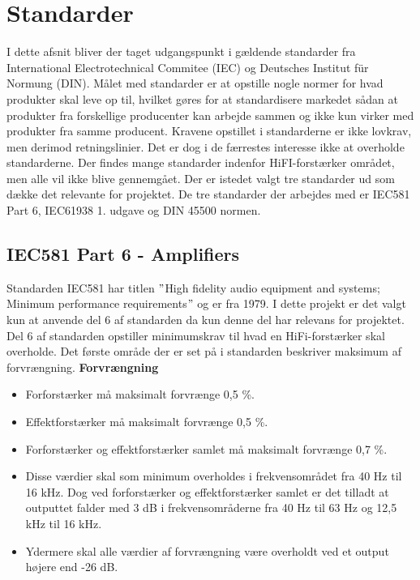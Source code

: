 \section{Standarder}
\label{standarder}
I dette afsnit bliver der taget udgangspunkt i gældende standarder fra International Electrotechnical Commitee (IEC) og Deutsches Institut f\"{u}r Normung (DIN). Målet med standarder er at opstille nogle normer for hvad produkter skal leve op til, hvilket gøres for at standardisere markedet sådan at produkter fra forskellige producenter kan arbejde sammen og ikke kun virker med produkter fra samme producent. Kravene opstillet i standarderne er ikke lovkrav, men derimod retningslinier. Det er dog i de færrestes interesse ikke at overholde standarderne.
\newline
\newline
Der findes mange standarder indenfor HiFI-forstærker området, men alle vil ikke blive gennemgået. Der er istedet valgt tre standarder ud som dække det relevante for projektet. De tre standarder der arbejdes med er IEC581 Part 6, IEC61938 1. udgave og DIN 45500 normen. 

\subsection*{IEC581 Part 6 - Amplifiers}
\label{IEC581}
Standarden IEC581 har titlen $"$High fidelity audio equipment and systems; Minimum performance requirements$"$ og er fra 1979. I dette projekt er det valgt kun at anvende del 6 af standarden da kun denne del har relevans for projektet. Del 6 af standarden opstiller minimumskrav til hvad en HiFi-forstærker skal overholde. \cite{IEC581-6}%
\newline
\newline
Det første område der er set på i standarden beskriver maksimum af forvrængning.
\newline 
\newline
\textbf{Forvrængning}
\begin{itemize}
\item Forforstærker må maksimalt forvrænge 0,5 \%.
\item Effektforstærker må maksimalt forvrænge 0,5 \%.
\item Forforstærker og effektforstærker samlet må maksimalt forvrænge 0,7 \%.
\item Disse værdier skal som minimum overholdes i frekvensområdet fra 40 Hz til 16 kHz. Dog ved forforstærker og effektforstærker samlet er det tilladt at outputtet falder med 3 dB i frekvensområderne fra 40 Hz til 63 Hz og 12,5 kHz til 16 kHz. 
\item Ydermere skal alle værdier af forvrængning være overholdt ved et output højere end -26 dB.
\end{itemize}

